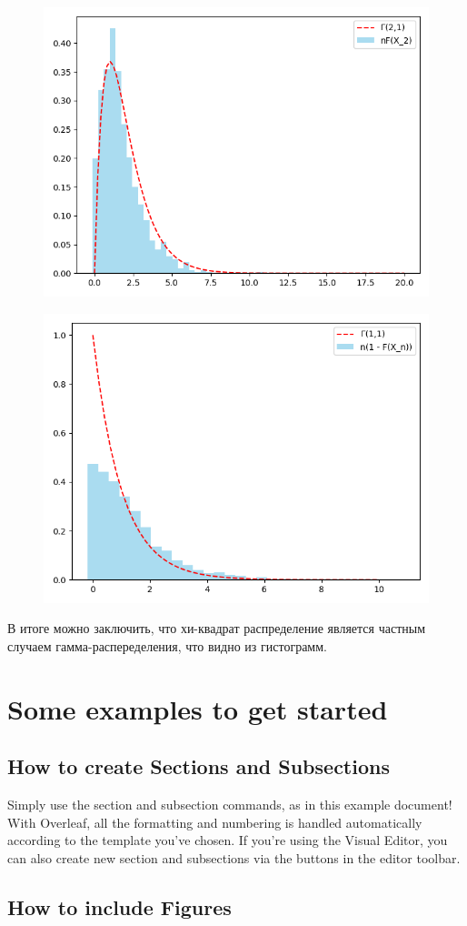 \documentclass{article}
\begin{document}
\begin{figure}
      \centering
      \includegraphics[width=0.5\linewidth]{Python/second-two-one.png}
      \caption{}
\end{figure}
\begin{figure}
      \centering
      \includegraphics[width=0.5\linewidth]{Python/second-one-one.png}
      \caption{}
\end{figure}

В итоге можно заключить, что хи-квадрат распределение является частным случаем гамма-распеределения, что видно из гистограмм.




\section{Some examples to get started}

\subsection{How to create Sections and Subsections}

Simply use the section and subsection commands, as in this example document! With Overleaf, all the formatting and numbering is handled automatically according to the template you've chosen. If you're using the Visual Editor, you can also create new section and subsections via the buttons in the editor toolbar.

\subsection{How to include Figures}
\end{document}
